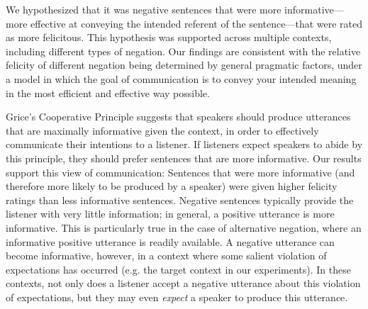\documentclass[10pt,letterpaper]{article}
\begin{document}
We hypothesized that it was negative sentences that were more informative---more effective at conveying the intended referent of the sentence---that were rated as more felicitous.  This hypothesis was supported across multiple contexts, including different types of negation.
Our findings are consistent with the relative felicity of different negation being determined by general pragmatic factors, under a model in which the goal of communication is to convey your intended meaning in the most efficient and effective way possible.  

Grice's Cooperative Principle suggests that speakers should produce utterances that are maximally informative given the context, in order to effectively communicate their intentions to a listener.  If listeners expect speakers to abide by this principle, they should prefer sentences that are more informative.  Our results support this view of communication: Sentences that were more informative (and therefore more likely to be produced by a speaker) were given higher felicity ratings than less informative sentences.  Negative sentences typically provide the listener with very little information; in general, a positive utterance is more informative.  This is particularly true in the case of alternative negation, where an informative positive utterance is readily available.  A negative utterance can become informative, however, in a context where some salient violation of expectations has occurred (e.g. the target context in our experiments).  In these contexts, not only does a listener accept a negative utterance about this violation of expectations, but they may even \emph{expect} a speaker to produce this utterance.

\end{document}
